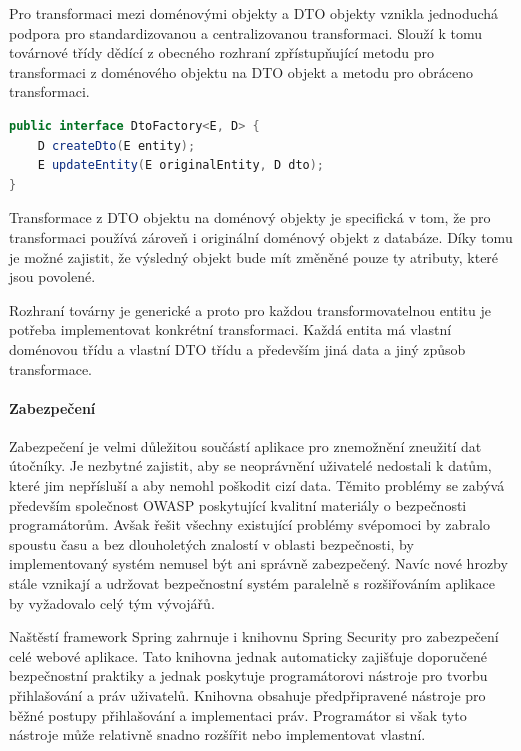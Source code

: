 			Pro transformaci mezi doménovými objekty a \ac{DTO} objekty vznikla jednoduchá podpora pro standardizovanou
			a centralizovanou transformaci.
			Slouží k tomu továrnové třídy dědící z obecného rozhraní zpřístupňující metodu pro transformaci z doménového
			objektu na \ac{DTO} objekt a metodu pro obráceno transformaci.

			\begin{lstlisting}[language=Java, caption={Ukázka obecného rozhraní třídy pro transformaci mezi doménovými objekty a DTO objekty. Zdroj: [autor]}]
public interface DtoFactory<E, D> {
    D createDto(E entity);
    E updateEntity(E originalEntity, D dto);
}
			\end{lstlisting}

			Transformace z \ac{DTO} objektu na doménový objekty je specifická v tom, že pro transformaci používá zároveň
			i originální doménový objekt z databáze.
			Díky tomu je možné zajistit, že výsledný objekt bude mít změněné pouze ty atributy, které jsou povolené.

			Rozhraní továrny je generické a proto pro každou transformovatelnou entitu je potřeba implementovat konkrétní
			transformaci.
			Každá entita má vlastní doménovou třídu a vlastní \ac{DTO} třídu a především jiná data a jiný způsob transformace.

			\paragraph{Zabezpečení}

			Zabezpečení je velmi důležitou součástí aplikace pro znemožnění zneužití dat útočníky.
			Je nezbytné zajistit, aby se neoprávnění uživatelé nedostali k datům, které jim nepřísluší a aby nemohl
			poškodit cizí data.
			Těmito problémy se zabývá především společnost OWASP poskytující kvalitní materiály o bezpečnosti programátorům.
			Avšak řešit všechny existující problémy svépomoci by zabralo spoustu času a bez dlouholetých znalostí v
			oblasti bezpečnosti, by implementovaný systém nemusel být ani správně zabezpečený.
			Navíc nové hrozby stále vznikají a udržovat bezpečnostní systém paralelně s rozšiřováním aplikace by vyžadovalo
			celý tým vývojářů.

			Naštěstí framework Spring zahrnuje i knihovnu Spring Security pro zabezpečení celé webové aplikace.
			Tato knihovna jednak automaticky zajišťuje doporučené bezpečnostní praktiky a jednak poskytuje programátorovi
			nástroje pro tvorbu přihlašování a práv uživatelů.
			Knihovna obsahuje předpřipravené nástroje pro běžné postupy přihlašování a implementaci práv.
			Programátor si však tyto nástroje může relativně snadno rozšířit nebo implementovat vlastní.

